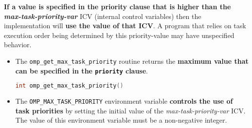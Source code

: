 \highspace
\textbf{If a value is specified in the priority clause that is higher than the \emph{max-task-priority-var}} ICV (internal control variables) then the implementation will \textbf{use the value of that ICV}. A program that relies on task execution order being determined by this priority-value may have unspecified behavior.
\begin{itemize}
    \item The \texttt{omp\_get\_max\_task\_priority} routine returns the \textbf{maximum value that can be specified in the \texttt{priority} clause}.
    \begin{openmpbox}
        \begin{lstlisting}[language=C++]
int omp_get_max_task_priority()\end{lstlisting}
    \end{openmpbox}

    \item The \texttt{OMP\_MAX\_TASK\_PRIORITY} environment variable \textbf{controls the use of task priorities} by setting the initial value of the \emph{max-task-priority-var} ICV. The value of this environment variable must be a non-negative integer.
\end{itemize}